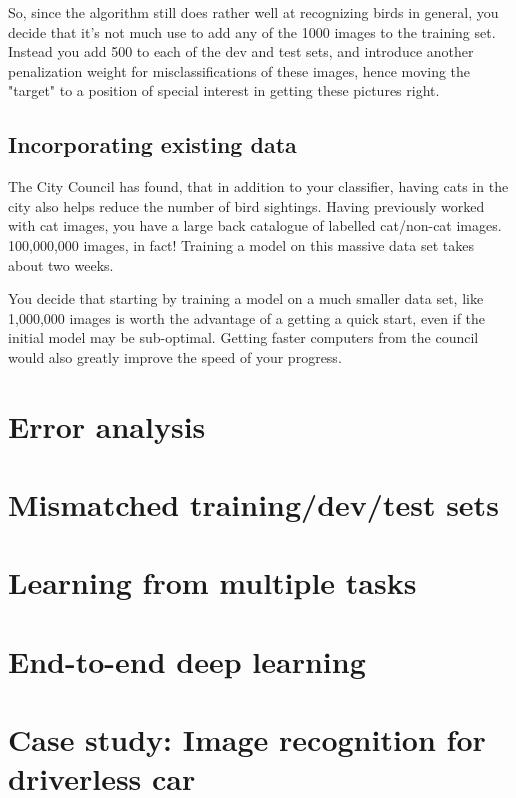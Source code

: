 \documentclass[12pt, a4paper]{article}
\numberwithin{equation}{section}
\begin{document}
So, since the algorithm still does rather well at recognizing birds in general, you decide that it's not much use to add any of the 1000 images to the training set. Instead you add 500 to each of the dev and test sets, and introduce another penalization weight for misclassifications of these images, hence moving the "target" to a position of special interest in getting these pictures right.

\subsection{Incorporating existing data}
The City Council has found, that in addition to your classifier, having cats in the city also helps reduce the number of bird sightings. Having previously worked with cat images, you have a large back catalogue of labelled cat/non-cat images. 100,000,000 images, in fact! Training a model on this massive data set takes about two weeks.

You decide that starting by training a model on a much smaller data set, like 1,000,000 images is worth the advantage of a getting a quick start, even if the initial model may be sub-optimal. Getting faster computers from the council would also greatly improve the speed of your progress.


\section{Error analysis}


\section{Mismatched training/dev/test sets}


\section{Learning from multiple tasks}


\section{End-to-end deep learning}


\section{Case study: Image recognition for driverless car}
\end{document}
